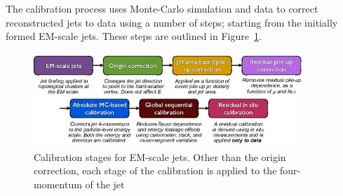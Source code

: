 The calibration process uses Monte-Carlo simulation and data to correct reconstructed jets to data using a number of steps;
starting from the initially formed EM-scale jets.
These steps are outlined in Figure~\ref{fig:obj-jets_calib_schem}.

\begin{figure}[!htb]
  \begin{center}
    \includegraphics[width=0.9\textwidth]{figs/Objects/jets_calib_schem.png}
    \caption[Calibration stages for EM-scale jets. Other than the origin correction, each stage of the calibration is applied to the four-momentum of the jet.]
            {Calibration stages for EM-scale jets. Other than the origin correction, each stage of the calibration is applied to the four-momentum of the jet~\cite{obj-jets_calib_run2}}
    \label{fig:obj-jets_calib_schem}
  \end{center}
  \vspace{-0.5cm}
\end{figure}

